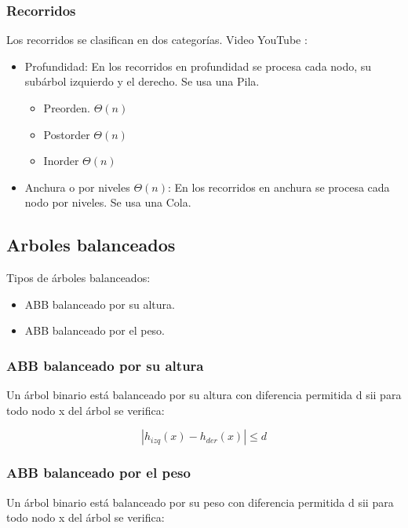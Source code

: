 \documentclass[../main.tex]{subfiles}
\begin{document}
        \subsubsection{Recorridos} 
            Los recorridos se clasifican en dos categorías. Video YouTube \cite{ABB-Recorridos_youtube}:
            \begin{itemize}
                \item Profundidad: En los recorridos en profundidad se procesa cada nodo, su subárbol izquierdo y el derecho. Se usa una Pila.
                    \begin{itemize}
                        \item Preorden. $\Theta(n)$
                        \item Postorder $\Theta(n)$
                        \item Inorder $\Theta(n)$
                    \end{itemize}
                \item Anchura o por niveles $\Theta(n)$: En los recorridos en anchura se procesa cada nodo por niveles. Se usa una Cola.
            \end{itemize} 
        
    \subsection{Arboles balanceados}
        Tipos de árboles balanceados:
        \begin{itemize}
            \item ABB balanceado por su altura.
            \item ABB balanceado por el peso.
        \end{itemize}

        \subsubsection{ABB balanceado por su altura}
            Un árbol binario está balanceado por su altura con diferencia permitida d sii para todo nodo x del árbol se verifica:

            \begin{equation}
                |h_{izq}(x) - h_{der}(x)| \leq d
            \end{equation}

        \subsubsection{ABB balanceado por el peso}
            Un árbol binario está balanceado por su peso con diferencia permitida d sii para todo nodo x del árbol se verifica:
\end{document}
